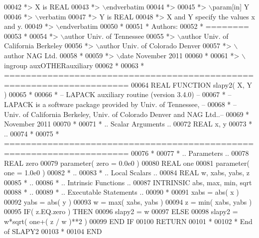\begin{DoxyCode}
00042 \textcolor{comment}{*>          X is REAL}
00043 \textcolor{comment}{*> \(\backslash\)endverbatim}
00044 \textcolor{comment}{*>}
00045 \textcolor{comment}{*> \(\backslash\)param[in] Y}
00046 \textcolor{comment}{*> \(\backslash\)verbatim}
00047 \textcolor{comment}{*>          Y is REAL}
00048 \textcolor{comment}{*>          X and Y specify the values x and y.}
00049 \textcolor{comment}{*> \(\backslash\)endverbatim}
00050 \textcolor{comment}{*}
00051 \textcolor{comment}{*  Authors:}
00052 \textcolor{comment}{*  ========}
00053 \textcolor{comment}{*}
00054 \textcolor{comment}{*> \(\backslash\)author Univ. of Tennessee }
00055 \textcolor{comment}{*> \(\backslash\)author Univ. of California Berkeley }
00056 \textcolor{comment}{*> \(\backslash\)author Univ. of Colorado Denver }
00057 \textcolor{comment}{*> \(\backslash\)author NAG Ltd. }
00058 \textcolor{comment}{*}
00059 \textcolor{comment}{*> \(\backslash\)date November 2011}
00060 \textcolor{comment}{*}
00061 \textcolor{comment}{*> \(\backslash\)ingroup auxOTHERauxiliary}
00062 \textcolor{comment}{*}
00063 \textcolor{comment}{*  =====================================================================}
00064 \textcolor{keyword}{      REAL             }\textcolor{keyword}{FUNCTION }slapy2( X, Y )
00065 \textcolor{comment}{*}
00066 \textcolor{comment}{*  -- LAPACK auxiliary routine (version 3.4.0) --}
00067 \textcolor{comment}{*  -- LAPACK is a software package provided by Univ. of Tennessee,    --}
00068 \textcolor{comment}{*  -- Univ. of California Berkeley, Univ. of Colorado Denver and NAG Ltd..--}
00069 \textcolor{comment}{*     November 2011}
00070 \textcolor{comment}{*}
00071 \textcolor{comment}{*     .. Scalar Arguments ..}
00072       \textcolor{keywordtype}{REAL}               x, y
00073 \textcolor{comment}{*     ..}
00074 \textcolor{comment}{*}
00075 \textcolor{comment}{*  =====================================================================}
00076 \textcolor{comment}{*}
00077 \textcolor{comment}{*     .. Parameters ..}
00078       \textcolor{keywordtype}{REAL}               zero
00079       parameter( zero = 0.0e0 )
00080       \textcolor{keywordtype}{REAL}               one
00081       parameter( one = 1.0e0 )
00082 \textcolor{comment}{*     ..}
00083 \textcolor{comment}{*     .. Local Scalars ..}
00084       \textcolor{keywordtype}{REAL}               w, xabs, yabs, z
00085 \textcolor{comment}{*     ..}
00086 \textcolor{comment}{*     .. Intrinsic Functions ..}
00087       \textcolor{keywordtype}{INTRINSIC}          abs, max, min, sqrt
00088 \textcolor{comment}{*     ..}
00089 \textcolor{comment}{*     .. Executable Statements ..}
00090 \textcolor{comment}{*}
00091       xabs = abs( x )
00092       yabs = abs( y )
00093       w = max( xabs, yabs )
00094       z = min( xabs, yabs )
00095       \textcolor{keywordflow}{IF}( z.EQ.zero ) \textcolor{keywordflow}{THEN}
00096          slapy2 = w
00097       \textcolor{keywordflow}{ELSE}
00098          slapy2 = w*sqrt( one+( z / w )**2 )
00099 \textcolor{keywordflow}{      END IF}
00100       \textcolor{keywordflow}{RETURN}
00101 \textcolor{comment}{*}
00102 \textcolor{comment}{*     End of SLAPY2}
00103 \textcolor{comment}{*}
00104 \textcolor{keyword}{      END}
\end{DoxyCode}

